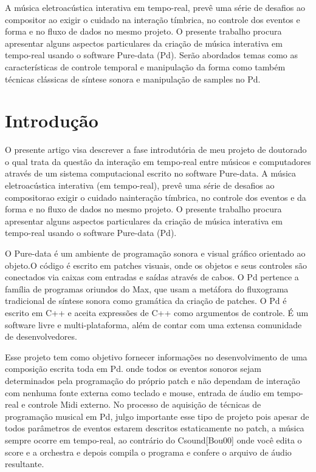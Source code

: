 \documentclass[12pt]{article}
\title{}
\author{Cristiano Figueiró\inst{1} \and 
        Pedro Kroger\inst{1}}
\begin{document}
 
\graphicspath{{figs/}}
\maketitle

\begin{abstract}
\end{abstract}
     
\begin{resumo} 
  A música eletroacústica interativa em tempo-real, prevê uma série de
  desafios ao compositor ao exigir o cuidado na interação tímbrica, no
  controle dos eventos e forma e no fluxo de dados no mesmo projeto. O
  presente trabalho procura apresentar alguns aspectos particulares da
  criação de música interativa em tempo-real usando o software
  Pure-data (Pd). Serão abordados temas como as características de
  controle temporal e manipulação da forma como também técnicas
  clássicas de síntese sonora e manipulação de samples no Pd.
\end{resumo}


\section{Introdução}
\label{sec:introducao}


O presente artigo visa descrever a fase introdutória de meu projeto de
doutorado o qual trata da questão da interação em tempo-real entre
músicos e computadores através de um sistema computacional escrito no
software Pure-data. A música eletroacústica interativa (em
tempo-real), prevê uma série de desafios ao compositorao exigir o
cuidado nainteração tímbrica, no controle dos eventos e da forma e no
fluxo de dados no mesmo projeto. O presente trabalho procura
apresentar alguns aspectos particulares da criação de música
interativa em tempo-real usando o software Pure-data (Pd).

O Pure-data  é um ambiente de programação sonora e visual gráfico 
orientado ao objeto.O código é escrito em patches visuais, onde os objetos 
e seus controles são conectados via caixas com  entradas e saídas através de cabos.
O Pd pertence a família de programas oriundos do Max, que usam a metáfora
do fluxograma tradicional de síntese sonora como gramática da criação de patches.
O Pd  é escrito em C++ e aceita expressões de C++ como argumentos de controle.
É um software livre e multi-plataforma, além de contar com uma 
extensa comunidade de desenvolvedores. 

Esse projeto tem como objetivo fornecer informações no desenvolvimento
de uma composição escrita toda em Pd. onde todos os eventos sonoros
sejam determinados pela programação do próprio patch e não dependam de
interação com nenhuma fonte externa como teclado e mouse, entrada
de áudio em tempo-real e controle Midi externo. No processo de
aquisição de técnicas de programação musical em Pd, julgo importante
esse tipo de projeto pois apesar de todos parâmetros de eventos
estarem descritos estaticamente no patch, a música sempre ocorre em
tempo-real, ao contrário do Csound[Bou00] onde você edita o score e a
orchestra e depois compila o programa e confere o arquivo de áudio
resultante.
  
\end{document}
